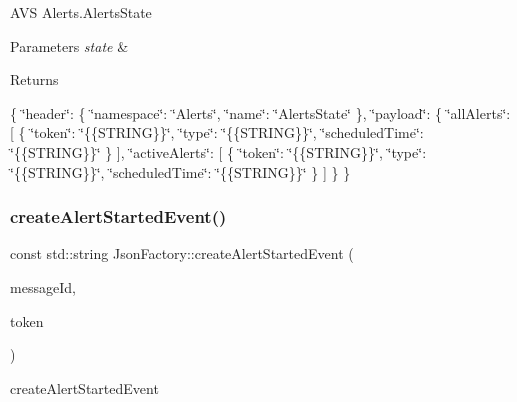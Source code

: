 A\+VS Alerts.\+Alerts\+State 
\begin{DoxyParams}{Parameters}
{\em state} & \\
\hline
\end{DoxyParams}
\begin{DoxyReturn}{Returns}

\end{DoxyReturn}
\{ \char`\"{}header\char`\"{}\+: \{ \char`\"{}namespace\char`\"{}\+: \char`\"{}\+Alerts\char`\"{}, \char`\"{}name\char`\"{}\+: \char`\"{}\+Alerts\+State\char`\"{} \}, \char`\"{}payload\char`\"{}\+: \{ \char`\"{}all\+Alerts\char`\"{}\+: \mbox{[} \{ \char`\"{}token\char`\"{}\+: \char`\"{}\{\{\+S\+T\+R\+I\+N\+G\}\}\char`\"{}, \char`\"{}type\char`\"{}\+: \char`\"{}\{\{\+S\+T\+R\+I\+N\+G\}\}\char`\"{}, \char`\"{}scheduled\+Time\char`\"{}\+: \char`\"{}\{\{\+S\+T\+R\+I\+N\+G\}\}\char`\"{} \} \mbox{]}, \char`\"{}active\+Alerts\char`\"{}\+: \mbox{[} \{ \char`\"{}token\char`\"{}\+: \char`\"{}\{\{\+S\+T\+R\+I\+N\+G\}\}\char`\"{}, \char`\"{}type\char`\"{}\+: \char`\"{}\{\{\+S\+T\+R\+I\+N\+G\}\}\char`\"{}, \char`\"{}scheduled\+Time\char`\"{}\+: \char`\"{}\{\{\+S\+T\+R\+I\+N\+G\}\}\char`\"{} \} \mbox{]} \} \} \mbox{\label{classAVSJson_1_1JsonFactory_af4b4bccd89a168a3ee57e73a346d5554}} 
\subsubsection{\texorpdfstring{create\+Alert\+Started\+Event()}{createAlertStartedEvent()}}
{\footnotesize\ttfamily const std\+::string Json\+Factory\+::create\+Alert\+Started\+Event (\begin{DoxyParamCaption}\item[{const std\+::string \&}]{message\+Id,  }\item[{const std\+::string \&}]{token }\end{DoxyParamCaption})}



create\+Alert\+Started\+Event 

